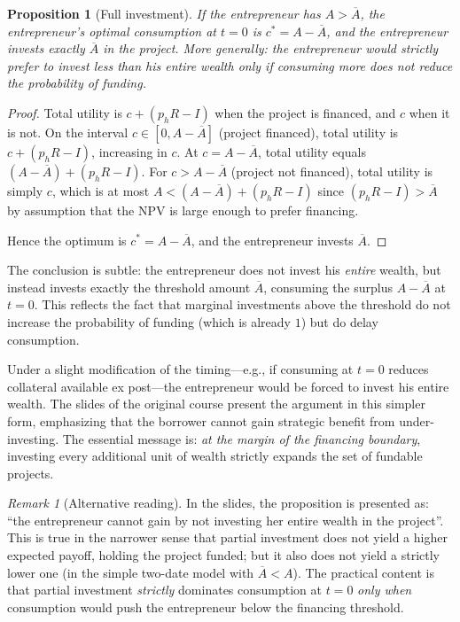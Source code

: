 \documentclass[11pt,a4paper,oneside]{book}
\theoremstyle{plain}
\newtheorem{proposition}[theorem]{Proposition}
\theoremstyle{definition}
\theoremstyle{remark}
\newtheorem{remark}[theorem]{Remark}
\numberwithin{equation}{chapter}
\begin{document}
\begin{proposition}[Full investment]\label{prop:full-investment}
If the entrepreneur has $A > \overline{A}$, the entrepreneur's optimal consumption at $t=0$ is $c^\ast = A - \overline{A}$, and the entrepreneur invests exactly $\overline{A}$ in the project.
More generally: the entrepreneur would strictly prefer to invest less than his entire wealth only if consuming more does not reduce the probability of funding.
\end{proposition}

\begin{proof}
Total utility is $c + (p_h R - I)$ when the project is financed, and $c$ when it is not.
On the interval $c \in [0, A - \overline{A}]$ (project financed), total utility is $c + (p_h R - I)$, increasing in $c$.
At $c = A - \overline{A}$, total utility equals $(A - \overline{A}) + (p_h R - I)$.
For $c > A - \overline{A}$ (project not financed), total utility is simply $c$, which is at most $A < (A - \overline{A}) + (p_h R - I)$ since $(p_h R - I) > \overline{A}$ by assumption that the NPV is large enough to prefer financing.

Hence the optimum is $c^\ast = A - \overline{A}$, and the entrepreneur invests $\overline{A}$.
\end{proof}

The conclusion is subtle: the entrepreneur does not invest his \emph{entire} wealth, but instead invests exactly the threshold amount $\overline{A}$, consuming the surplus $A - \overline{A}$ at $t=0$.
This reflects the fact that marginal investments above the threshold do not increase the probability of funding (which is already $1$) but do delay consumption.

Under a slight modification of the timing---e.g., if consuming at $t=0$ reduces collateral available ex post---the entrepreneur would be forced to invest his entire wealth.
The slides of the original course present the argument in this simpler form, emphasizing that the borrower cannot gain strategic benefit from under-investing.
The essential message is: \emph{at the margin of the financing boundary}, investing every additional unit of wealth strictly expands the set of fundable projects.

\begin{remark}[Alternative reading]\label{rem:full-investment-alternative}
In the slides, the proposition is presented as: ``the entrepreneur cannot gain by not investing her entire wealth in the project''.
This is true in the narrower sense that partial investment does not yield a higher expected payoff, holding the project funded; but it also does not yield a strictly lower one (in the simple two-date model with $\overline{A} < A$).
The practical content is that partial investment \emph{strictly} dominates consumption at $t=0$ \emph{only when} consumption would push the entrepreneur below the financing threshold.
\end{remark}
\end{document}
